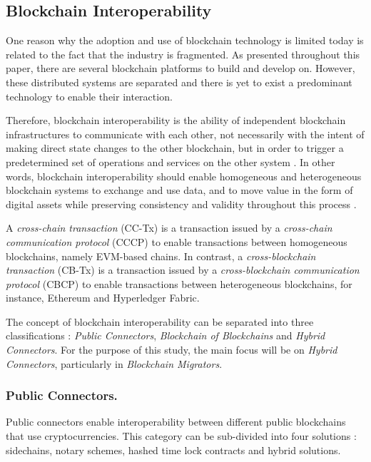 \documentclass[runningheads]{llncs}
\begin{document}
\subsection{Blockchain Interoperability} \label{interoperability}
One reason why the adoption and use of blockchain technology is limited today is related to the fact that the industry is fragmented. As presented throughout this paper, there are several blockchain platforms to build and develop on. However, these distributed systems are separated and there is yet to exist a predominant technology to enable their interaction.

Therefore, blockchain interoperability is the ability of independent blockchain infrastructures to communicate with each other, not necessarily with the intent of making direct state changes to the other blockchain, but in order to trigger a predetermined set of operations and services on the other system \cite{abrunhosa_2021}. In other words, blockchain interoperability should enable homogeneous and heterogeneous blockchain systems to exchange and use data, and to move value in the form of digital assets while preserving consistency and validity throughout this process \cite{survey}.

A \textit{cross-chain transaction} (CC-Tx) \cite{survey} is a transaction issued by a \textit{cross-chain communication protocol} (CCCP) to enable transactions between homogeneous blockchains, namely EVM-based chains. In contrast, a \textit{cross-blockchain transaction} (CB-Tx) \cite{survey} is a transaction issued by a \textit{cross-blockchain communication protocol} (CBCP) to enable transactions between heterogeneous blockchains, for instance, Ethereum and Hyperledger Fabric.

The concept of blockchain interoperability can be separated into three classifications \cite{survey}: \textit{Public Connectors}, \textit{Blockchain of Blockchains} and \textit{Hybrid Connectors}. For the purpose of this study, the main focus will be on \textit{Hybrid Connectors}, particularly in \textit{Blockchain Migrators}.

\subsubsection{Public Connectors.} Public connectors enable interoperability between different public blockchains that use cryptocurrencies. This category can be sub-divided into four solutions \cite{survey}: sidechains, notary schemes, hashed time lock contracts and hybrid solutions.
\end{document}
